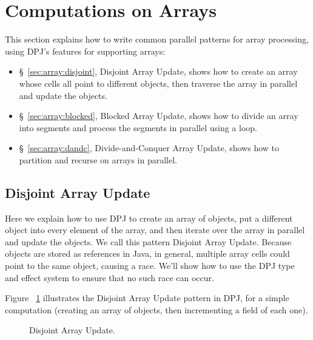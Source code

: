 \section{Computations on Arrays%
\label{sec:array}}

This section explains how to write common parallel patterns for array
processing, using DPJ's features for supporting arrays:
%
\begin{itemize}
\item \S~\ref{sec:array:disjoint}, Disjoint Array Update, shows how to
  create an array whose cells all point to different objects, then
  traverse the array in parallel and update the objects.
%
\item \S~\ref{sec:array:blocked}, Blocked Array Update, shows how to
  divide an array into segments and process the segments in parallel
  using a loop. 
%
\item \S~\ref{sec:array:dandc}, Divide-and-Conquer Array Update, shows
  how to partition and recurse on arrays in parallel.
\end{itemize}

\subsection{Disjoint Array Update%
\label{sec:array:disjoint}}

Here we explain how to use DPJ to create an array of objects, put a
different object into every element of the array, and then iterate
over the array in parallel and update the objects.  We call this
pattern Disjoint Array Update.  Because objects are stored as
references in Java, in general, multiple array cells could point to
the same object, causing a race.  We'll show how to use the DPJ type
and effect system to ensure that no such race can occur.


 Figure ~\ref{fig:array:disjoint}
illustrates the Disjoint Array Update pattern in DPJ, for a simple
computation (creating an array of objects, then incrementing a field
of each one).

\begin{figure}

\caption{Disjoint Array Update.}
\label{fig:array:disjoint}
\end{figure}


